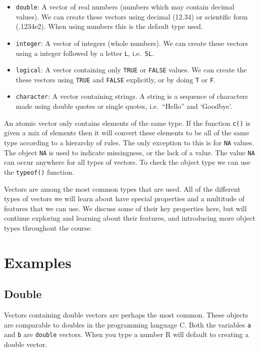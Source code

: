 \documentclass[
]{book}
\begin{document}
\begin{itemize}
\item
  \texttt{double}: A vector of real numbers (numbers which may contain decimal values). We can create these vectors using decimal (12.34) or scientific form (.1234e2). When using numbers this is the default type used.
\item
  \texttt{integer}: A vector of integers (whole numbers). We can create these vectors using a integer followed by a letter \texttt{L}, i.e.~\texttt{5L}.
\item
  \texttt{logical}: A vector containing only \texttt{TRUE} or \texttt{FALSE} values. We can create the these vectors using \texttt{TRUE} and \texttt{FALSE} explicitly, or by doing \texttt{T} or \texttt{F}.
\item
  \texttt{character}: A vector containing strings. A string is a sequence of characters made using double quotes or single quotes, i.e.~``Hello'' and `Goodbye'.
\end{itemize}

An atomic vector only contains elements of the same type. If the function \texttt{c()} is given a mix of elements then it will convert these elements to be all of the same type according to a hierarchy of rules. The only exception to this is for \texttt{NA} values. The object \texttt{NA} is used to indicate missingness, or the lack of a value. The value \texttt{NA} can occur anywhere for all types of vectors. To check the object type we can use the \texttt{typeof()} function.

Vectors are among the most common types that are used. All of the different types of vectors we will learn about have special properties and a multitude of features that we can use. We discuss some of their key properties here, but will continue exploring and learning about their features, and introducing more object types throughout the course.

\hypertarget{examples}{%
\section{Examples}\label{examples}}

\hypertarget{double}{%
\subsection*{Double}\label{double}}

Vectors containing double vectors are perhaps the most common. These objects are comparable to doubles in the programming language C. Both the variables \texttt{a} and \texttt{b} are \texttt{double} vectors. When you type a number R will default to creating a double vector.
\end{document}
